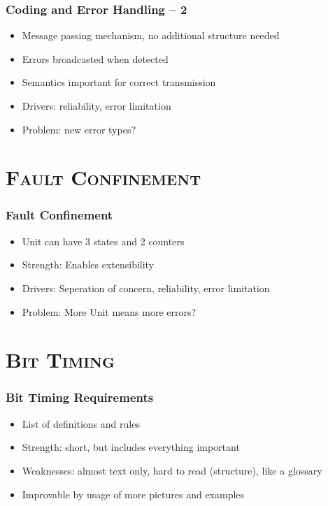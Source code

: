 \documentclass[xcolor=x11names,compress]{beamer}
\renewcommand{\(}{\begin{columns}}
\renewcommand{\)}{\end{columns}}
\newcommand{\<}[1]{\begin{column}{#1}}
\renewcommand{\>}{\end{column}}
\begin{document}
\begin{frame}
  \frametitle{Coding and Error Handling -- 2}

  \begin{itemize}
    \item Message passing mechanism, no additional structure needed
    \item Errors broadcasted when detected
    \item Semantics important for correct transmission
    \item Drivers: reliability, error limitation
    \item Problem: new error types?
  \end{itemize}

\end{frame}


\section{\scshape Fault Confinement}
\begin{frame}
  \frametitle{Fault Confinement}
  
    \begin{itemize}
    \item Unit can have 3 states and 2 counters
    \item Strength: Enables extensibility
    \item Drivers: Seperation of concern, reliability, error limitation
    \item Problem: More Unit means more errors?
  \end{itemize}

\end{frame}


\section{\scshape Bit Timing}
\begin{frame}
  \frametitle{Bit Timing Requirements}


\begin{itemize}
    \item List of definitions and rules
    \item Strength: short, but includes everything important
    \item Weaknesses: almost text only, hard to read (structure),
        like a glossary
    \item Improvable by usage of more pictures and examples

\end{itemize}


\end{frame}
\end{document}
